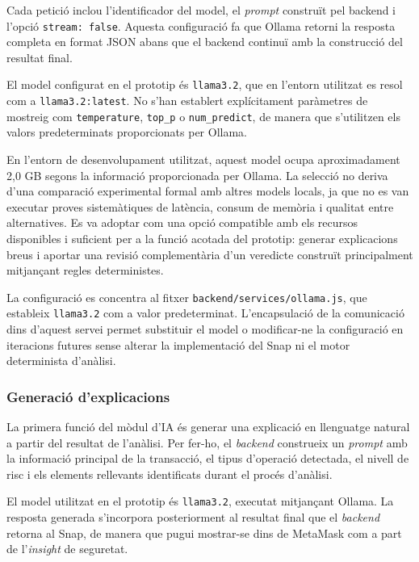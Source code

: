 Cada petició inclou l’identificador del model, el \textit{prompt} construït pel backend i l’opció \texttt{stream: false}. Aquesta configuració fa que Ollama retorni la resposta completa en format JSON abans que el backend continuï amb la construcció del resultat final.

El model configurat en el prototip és \texttt{llama3.2}, que en l’entorn utilitzat es resol com a \texttt{llama3.2:latest}. No s’han establert explícitament paràmetres de mostreig com \texttt{temperature}, \texttt{top\_p} o \texttt{num\_predict}, de manera que s’utilitzen els valors predeterminats proporcionats per Ollama.

En l’entorn de desenvolupament utilitzat, aquest model ocupa aproximadament 2,0 GB segons la informació proporcionada per Ollama. La selecció no deriva d’una comparació experimental formal amb altres models locals, ja que no es van executar proves sistemàtiques de latència, consum de memòria i qualitat entre alternatives. Es va adoptar com una opció compatible amb els recursos disponibles i suficient per a la funció acotada del prototip: generar explicacions breus i aportar una revisió complementària d’un veredicte construït principalment mitjançant regles deterministes.

La configuració es concentra al fitxer \texttt{backend/services/ollama.js}, que estableix \texttt{llama3.2} com a valor predeterminat. L’encapsulació de la comunicació dins d’aquest servei permet substituir el model o modificar-ne la configuració en iteracions futures sense alterar la implementació del Snap ni el motor determinista d’anàlisi.


\subsubsection{Generació d’explicacions}

La primera funció del mòdul d’IA és generar una explicació en llenguatge natural a partir del resultat de l’anàlisi. Per fer-ho, el \textit{backend} construeix un \textit{prompt} amb la informació principal de la transacció, el tipus d’operació detectada, el nivell de risc i els elements rellevants identificats durant el procés d’anàlisi.

El model utilitzat en el prototip és \texttt{llama3.2}, executat mitjançant Ollama. La resposta generada s’incorpora posteriorment al resultat final que el \textit{backend} retorna al Snap, de manera que pugui mostrar-se dins de MetaMask com a part de l’\textit{insight} de seguretat.

